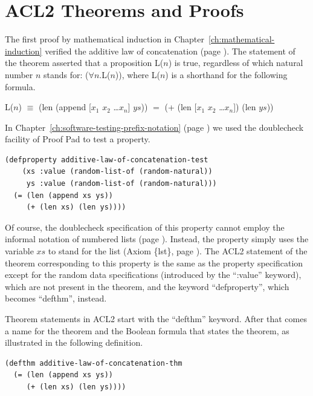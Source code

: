 \section{ACL2 Theorems and Proofs}
\label{sec:theorems-and-acl2-proofs}

The first proof by mathematical induction
in Chapter~\ref{ch:mathematical-induction}
verified the additive law of concatenation
(page \pageref{additive-law-concatenation}).
The statement of the theorem asserted that a proposition L($n$) is true,
regardless of which natural number $n$ stands for: ($\forall$$n$.L($n$)),
where L($n$) is a shorthand for the following formula.
\begin{center}
L($n$) $\equiv$ (len (append [$x_1$ $x_2$ \dots $x_n$] $ys$)) $=$ (+ (len [$x_1$ $x_2$ \dots $x_n$]) (len $ys$))
\end{center}

In Chapter~\ref{ch:software-testing-prefix-notation} (page \pageref{additive-lengths-test})
we used the doublecheck facility of Proof Pad to test a property.

\begin{Verbatim}
(defproperty additive-law-of-concatenation-test
    (xs :value (random-list-of (random-natural))
     ys :value (random-list-of (random-natural)))
  (= (len (append xs ys))
     (+ (len xs) (len ys))))
\end{Verbatim}

Of course, the doublecheck specification of this property
cannot employ the informal notation of numbered lists
(page \pageref{numbered-list-interpretation}).
Instead, the property simply uses the variable $xs$ to stand for the list
(Axiom \{lst\}, page \pageref{axiom:lst}).
The ACL2 statement of the theorem corresponding to this property
is the same as the property specification
except for the random data specifications (introduced
by the ``:value'' keyword), which are not present in the theorem,
and the keyword ``defproperty'',
which becomes ``defthm'', instead.

Theorem statements in ACL2 start with the
``defthm'' keyword.
After that comes a name for the theorem and the Boolean formula
that states the theorem, as illustrated in
the following definition.

\begin{Verbatim}
(defthm additive-law-of-concatenation-thm
  (= (len (append xs ys))
     (+ (len xs) (len ys))))
\end{Verbatim}


